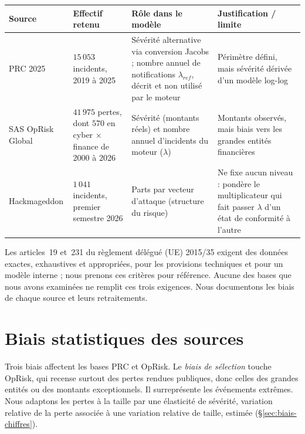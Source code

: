 \begin{center}
\renewcommand{\arraystretch}{1.3}
\begin{tabular}{>{\raggedright}p{2.75cm} >{\raggedright}p{2.6cm} >{\raggedright}p{3.9cm} >{\raggedright\arraybackslash}p{4.05cm}}
\toprule
\rowcolor{lightblue}
\textbf{Source} & \textbf{Effectif retenu} & \textbf{Rôle dans le modèle} & \textbf{Justification / limite} \\
\midrule
PRC 2025 & $15\,053$ incidents, 2019 à 2025 & Sévérité alternative via conversion Jacobs ; nombre annuel de notifications $\lambda_{ref}$, décrit et non utilisé par le moteur &
Périmètre défini, mais sévérité dérivée d'un modèle log-log \\
\addlinespace
SAS OpRisk Global & $41\,975$ pertes, dont $570$ en cyber $\times$ finance de 2000 à 2026 & Sévérité (montants réels) et nombre annuel d'incidents du moteur ($\lambda$) &
Montants observés, mais biais vers les grandes entités financières \\
\addlinespace
Hackmageddon & $1\,041$ incidents, premier semestre 2026 & Parts par vecteur d'attaque (structure du risque) &
Ne fixe aucun niveau : pondère le multiplicateur qui fait passer $\lambda$ d'un état de conformité à l'autre \\
\bottomrule
\end{tabular}
\end{center}

Les articles~19 et~231 du règlement délégué (UE) 2015/35 exigent des données exactes, exhaustives et
appropriées, pour les provisions techniques et pour un modèle interne ; nous prenons ces critères pour référence. Aucune des bases que nous avons examinées ne remplit ces trois exigences. Nous documentons les biais de chaque source et leurs retraitements.


\section{Biais statistiques des sources}
\label{sec:trois-biais}

Trois biais affectent les bases PRC et OpRisk. Le
\emph{biais de sélection} touche OpRisk, qui recense surtout des pertes rendues publiques, donc
celles des grandes entités ou des montants exceptionnels. Il surreprésente les événements extrêmes.
Nous adaptons les pertes à la taille par une élasticité de sévérité, variation relative de la perte associée à une variation relative de taille, estimée
(\S\ref{sec:biais-chiffres}).

